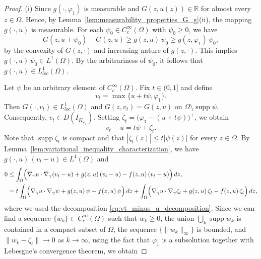 \documentclass[11pt]{article}
\newcommand{\om} {\Omega}
\newcommand{\real}{\mathbb{R}}
\newcommand{\gradgr}{\nabla_{\gamma}}
\begin{document}
\begin{proof}
\textnormal{(i)} 
Since $g(\cdot,\varphi_1)$ is measurable and $G(z,u(z)) \in \real$ for almost every $z \in \om$.  Hence, by Lemma~\ref{lem:measurability_properties_G_g}\textnormal{(ii)}, the mapping $g(\cdot,u)$ is measurable.
For each $\psi_0 \in C_c^{\infty}(\Omega)$ with $\psi_0 \ge 0$, we have
\[
G(z, u+\psi_0) - G(z,u) \ge g(z,u)\,\psi_0 \ge g(z,\varphi_1)\,\psi_0,
\]
by the convexity of $G(z,\cdot)$ and increasing nature of $g(z,\cdot)$. This implies $g(\cdot,u)\,\psi_0 \in L^{1}(\Omega)$. By the arbitrariness of $\psi_0$, it follows that $g(\cdot,u) \in L_{loc}^{1}(\Omega)$.

Let $\psi$ be an arbitrary element of $C_c^{\infty}(\Omega)$. Fix $t \in (0,1]$ and define
\begin{equation*}
v_t = \max\{u + t\psi, \varphi_1\}.
\end{equation*}
Then $G(\cdot,v_t) \in L_{loc}^{1}(\Omega)$ and $G(z,v_t) = G(z,u)$ on $\Omega \setminus \operatorname{supp}\psi$. Consequently, $v_t \in D(I_{K_{\varphi_1}})$. Setting $\zeta_t = \bigl(\varphi_1 - (u + t\psi)\bigr)^{+}$, we obtain
\begin{equation}
\label{eq:vt_minus_u_decomposition}
v_t - u = t\psi + \zeta_t .
\end{equation}
Note that $\operatorname{supp} \zeta_t$ is compact and that $|\zeta_t(z)| \le t|\psi(z)|$ for every $z \in \Omega$.
By Lemma~\ref{lem:variational_inequality_characterization}, we have $g(\cdot,u)\,(v_t-u) \in L^{1}(\Omega)$ and
\begin{equation}\label{eq:vt_with_characterisation}
\begin{aligned}
0 &\le \int_{\Omega} \Bigl( \gradgr u \cdot \gradgr (v_t - u) + g(z,u)\,(v_t - u) - f(z,u)\,(v_t - u) \Bigr)\, dz, \\
& =t \int_{\Omega} \Bigl( \gradgr u \cdot \gradgr \psi + g(z,u)\,\psi - f(z,u)\,\psi \Bigr)\, dz  {} + \int_{\Omega} \Bigl( \gradgr u \cdot \gradgr \zeta_t + g(z,u)\, \zeta_t - f(z,u)\, \zeta_t \Bigr)\, dz,
\end{aligned}
\end{equation}
where we used the decomposition \eqref{eq:vt_minus_u_decomposition}.
Since we can find a sequence $\{w_k\} \subset C_c^{\infty}(\Omega)$ such that $w_k \ge 0$, the union
$\bigcup_k \operatorname{supp} w_k$ is contained in a compact subset of $\Omega$, the sequence
$\{\|w_k\|_{\infty}\}$ is bounded, and $\|w_k - \zeta_t\| \to 0$ as $k \to \infty$, using the fact that
$\varphi_1$ is a subsolution together with Lebesgue's convergence theorem, we obtain

\end{proof}
\end{document}
